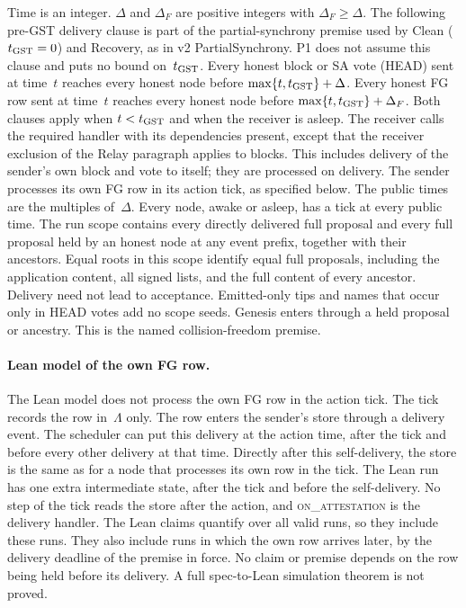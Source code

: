 \documentclass{article}
\theoremstyle{plain}
\theoremstyle{definition}
\theoremstyle{remark}
\begin{document}
Time is an integer.  $\Delta$ and $\Delta_F$ are positive integers with $\Delta_F\geq\Delta$.  The following
pre-GST delivery clause is part of the partial-synchrony premise used by Clean
($t_{\rm GST}=0$) and Recovery, as in v2 \textsf{PartialSynchrony}.
P1 does not assume this clause and puts no bound on~$t_{\rm GST}$.
Every honest block or SA vote (HEAD) sent at time~$t$ reaches every honest
node before $\max\{t,t_{\rm GST}\}+\Delta$.  Every honest FG row sent at
time~$t$ reaches every honest node before $\max\{t,t_{\rm GST}\}+\Delta_F$.
Both clauses apply when $t<t_{\rm GST}$ and when the receiver is asleep.
The receiver calls the required handler with its dependencies present,
except that the receiver exclusion of the Relay paragraph applies to blocks.
This includes delivery of the sender's own block and vote to itself;
they are processed on delivery.  The sender processes its own FG row
in its action tick, as specified below.  The public times are the multiples
of~$\Delta$.  Every node, awake or asleep, has a tick at every public
time.  The run scope contains every directly delivered full proposal and every full
proposal held by an honest node at any event prefix, together with their
ancestors. Equal roots in this scope identify equal full proposals, including
the application content, all signed lists, and the full content of every
ancestor. Delivery need not lead to acceptance. Emitted-only tips and names
that occur only in HEAD votes add no scope seeds. Genesis enters through a
held proposal or ancestry. This is the named collision-freedom premise.

\paragraph{Lean model of the own FG row.}
The Lean model does not process the own FG row in the action tick. The
tick records the row in~$\Lambda$ only. The row enters the sender's
store through a delivery event. The scheduler can put this delivery at
the action time, after the tick and before every other delivery at that
time. Directly after this self-delivery, the store is the same as for a
node that processes its own row in the tick. The Lean run has one extra
intermediate state, after the tick and before the self-delivery. No step
of the tick reads the store after the action, and \textsc{on\_attestation}
is the delivery handler. The Lean claims quantify over all valid runs, so
they include these runs. They also include runs in which the own row
arrives later, by the delivery deadline of the premise in force. No claim
or premise depends on the row being held before its delivery. A full
spec-to-Lean simulation theorem is not proved.
\end{document}
